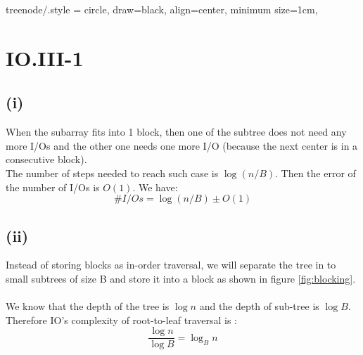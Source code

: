 
\tikzset
{
    treenode/.style = {circle, draw=black, align=center, minimum size=1cm},
}

\section*{IO.III-1}

\subsection*{(i)}
When the subarray fits into 1 block, then one of the subtree does not need any more I/Os and the other one needs one more I/O (because the next center is in a consecutive block).\\ 

The number of steps needed to reach such case is $\log(n/B)$. Then the error of the number of I/Os is $O(1)$. We have:
$$\#I/Os = \log(n/B) \pm O(1)$$

\subsection*{(ii)}
Instead of storing blocks as in-order traversal, we will separate the tree in to small subtrees of size B and store it into a block as shown in figure \ref{fig:blocking}.
\\\\
We know that the depth of the tree is $\log n$ and the depth of sub-tree is $\log B$. Therefore IO's complexity of root-to-leaf traversal is :
$$\frac{\log n}{\log B} = \log_{B} n$$

